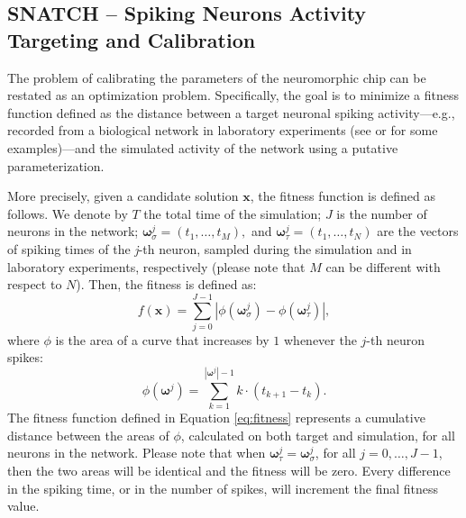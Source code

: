 \documentclass[utf8]{frontiersFPHY} %
\begin{document}
\subsection{SNATCH -- Spiking Neurons Activity Targeting and Calibration} 
The problem of calibrating the parameters of the neuromorphic chip can be restated as an optimization problem.
Specifically, the goal is to minimize a fitness function defined as the distance between a target neuronal spiking activity---e.g., recorded from a biological network in laboratory experiments (see \cite{} or \cite{} for some  examples)---and the simulated activity of the network using a putative parameterization. 

More precisely, given a candidate solution $\textbf{x}$, the fitness function is defined as follows. 
We denote by $T$ the total time of the simulation;  $J$ is the number of neurons in the network; $\boldsymbol{\omega}_{\sigma}^j = (t_1, \dots, t_M), $ and $\boldsymbol{\omega}_{\tau}^j = (t_1, \dots, t_N)$ are the vectors of spiking times of the \textit{j}-th neuron, sampled during the simulation and in laboratory experiments, respectively (please note that $M$ can be different with respect to $N$). 
Then, the fitness is defined as:
\begin{equation}
f(\textbf{x}) = \displaystyle \sum_{j=0}^{J-1} \left|\phi(\boldsymbol{\omega}_{\sigma}^j) - \phi(\boldsymbol{\omega}_{\tau}^j)\right|,
\label{eq:fitness}
\end{equation}
where $\phi$ is the area of a curve that increases by $1$ whenever the $j$-th neuron spikes:
\begin{equation}
    \phi(\boldsymbol{\omega}^j) = \sum_{k=1}^{|\boldsymbol{\omega}^j|-1} k \cdot ( t_{k+1} - t_k ).
\end{equation}
The fitness function defined in Equation \ref{eq:fitness} represents a cumulative distance between the areas of $\phi$, calculated on both target and simulation, for all neurons in the network. 
Please note that when $\boldsymbol{\omega}_{\tau}^j = \boldsymbol{\omega}_{\sigma}^j$, for all $j=0, \dots, J-1$, then the two areas will be identical and the fitness will be zero.
Every difference in the spiking time, or in the number of spikes, will increment the final fitness value.
\end{document}
